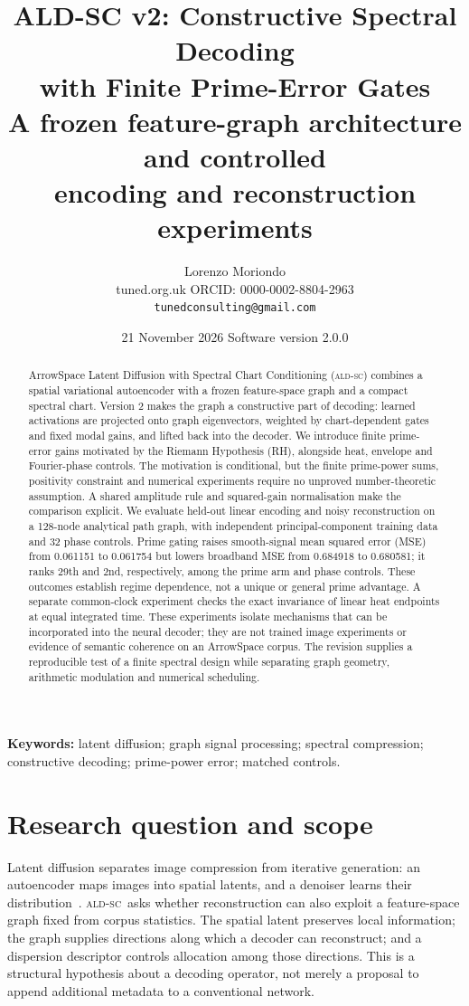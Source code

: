 \documentclass[10pt]{article}
\title{\textbf{ALD-SC v2: Constructive Spectral Decoding\\
with Finite Prime-Error Gates}\\[4pt]
\large A frozen feature-graph architecture and controlled\\
encoding and reconstruction experiments}
\author{Lorenzo Moriondo\\
\small tuned.org.uk \quad ORCID: 0000-0002-8804-2963\\
\small \texttt{tunedconsulting@gmail.com}}
\date{21 November 2026 \quad Software version 2.0.0}
\newcommand{\ALDSC}{\textsc{ald-sc}}
\begin{document}
\maketitle

\begin{abstract}
ArrowSpace Latent Diffusion with Spectral Chart Conditioning (\ALDSC)
combines a spatial variational autoencoder with a frozen feature-space
graph and a compact spectral chart. Version 2 makes the graph a constructive
part of decoding: learned activations are projected onto graph eigenvectors,
weighted by chart-dependent gates and fixed modal gains, and lifted back
into the decoder. We introduce finite prime-error gains motivated by the
Riemann Hypothesis (RH), alongside heat, envelope and Fourier-phase controls.
The motivation is conditional, but the finite prime-power sums, positivity
constraint and numerical experiments require no unproved number-theoretic
assumption. A shared amplitude rule and squared-gain normalisation make the
comparison explicit. We evaluate held-out linear encoding and noisy
reconstruction on a 128-node analytical path graph, with independent
principal-component training data and 32 phase controls. Prime gating
raises smooth-signal mean squared error (MSE) from 0.061151 to 0.061754 but lowers broadband
MSE from 0.684918 to 0.680581; it ranks 29th and 2nd, respectively,
among the prime arm and phase controls. These outcomes establish
regime dependence, not a unique or general prime advantage. A separate
common-clock experiment checks the exact invariance of linear heat
endpoints at equal integrated time. These experiments isolate mechanisms
that can be incorporated into the neural decoder; they are not trained
image experiments or evidence of semantic coherence on an ArrowSpace
corpus. The revision supplies a reproducible test of a finite spectral
design while separating graph geometry, arithmetic modulation and
numerical scheduling.
\end{abstract}

\noindent\textbf{Keywords:} latent diffusion; graph signal processing;
spectral compression; constructive decoding; prime-power error;
matched controls.

\section{Research question and scope}
\label{sec:introduction}

Latent diffusion separates image compression from iterative generation:
an autoencoder maps images into spatial latents, and a denoiser learns
their distribution~\cite{rombach}. \ALDSC\ asks whether reconstruction
can also exploit a feature-space graph fixed from corpus statistics.
The spatial latent preserves local information; the graph supplies
directions along which a decoder can reconstruct; and a dispersion
descriptor controls allocation among those directions. This is a
structural hypothesis about a decoding operator, not merely a proposal
to append additional metadata to a conventional network.
\end{document}
